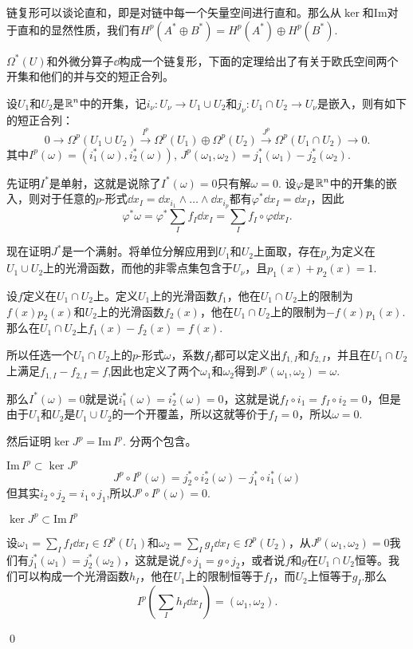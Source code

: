 \para \label{directsum} 链复形可以谈论直和，即是对链中每一个矢量空间进行直和。那么从$\ker$和$\mathrm{Im}$对于直和的显然性质，我们有$H^p(A^*\oplus B^*)=H^p(A^*)\oplus H^p(B^*)$.

$\Omega^*(U)$和外微分算子$\dd$构成一个链复形，下面的定理给出了有关于欧氏空间两个开集和他们的并与交的短正合列。

\theo 设$U_1$和$U_2$是$\mathbb{R}^n$中的开集，记$i_\nu:U_\nu \to U_1 \cup U_2$和$j_\nu:U_1\cap U_2 \to U_\nu$是嵌入，则有如下的短正合列：
\[
0\to \Omega^p(U_1\cup U_2)\xrightarrow{I^p}\Omega^p(U_1)\oplus\Omega^p(U_2)\xrightarrow{J^p}\Omega^p(U_1\cap U_2)\to 0.
\]
其中$I^p(\omega)=(i_1^*(\omega),i_2^*(\omega))$, $J^p(\omega_1,\omega_2)=j_1^*(\omega_1)-j_2^*(\omega_2)$.

\proof 先证明$I^*$是单射，这就是说除了$I^*(\omega)=0$只有解$\omega=0$. 设$\varphi$是$\mathbb{R}^n$中的开集的嵌入，则对于任意的$p$-形式$\dd x_I=\dd x_{i_1}\wedge\dots\wedge\dd x_{i_p}$都有$\varphi^* \dd x_I =\dd x_I$，因此
\[
\varphi^*\omega=\varphi^*\sum_If_I\dd x_I=\sum_If_I\circ\varphi \dd x_I.
\]

现在证明$J^*$是一个满射。将单位分解应用到$U_1$和$U_2$上面取，存在$p_\nu$为定义在$U_1\cup U_2$上的光滑函数，而他的非零点集包含于$U_\nu$，且$p_1(x)+p_2(x)=1$.

设$f$定义在$U_1\cap U_2$上。定义$U_1$上的光滑函数$f_1$，他在$U_1\cap U_2$上的限制为$f(x)p_2(x)$和$U_2$上的光滑函数$f_2(x)$，他在$U_1\cap U_2$上的限制为$-f(x)p_1(x)$.那么在$U_1\cap U_2$上$f_1(x)-f_2(x)=f(x)$.

所以任选一个$U_1\cap U_2$上的$p$-形式$\omega$，系数$f_I$都可以定义出$f_{1,I}$和$f_{2,I}$，并且在$U_1\cap U_2$上满足$f_{1,I}-f_{2,I}=f$,因此也定义了两个$\omega_1$和$\omega_2$得到$J^p(\omega_1,\omega_2)=\omega$.

那么$I^*(\omega)=0$就是说$i_1^*(\omega)=i_2^*(\omega)=0$，这就是说$f_I\circ i_1=f_I\circ i_2=0$，但是由于$U_1$和$U_2$是$U_1\cup U_2$的一个开覆盖，所以这就等价于$f_I=0$，所以$\omega=0$.

然后证明$\ker J^p=\mathrm{Im}\, I^p$. 分两个包含。

\begin{compactenum}[(1)]
\item $\mathrm{Im}\, I^p\subset \ker J^p$
\[
J^p\circ I^p(\omega)=j_2^*\circ i_2^*(\omega)-j_1^*\circ i_1^*(\omega)
\]
但其实$i_2\circ j_2=i_1\circ j_1$,所以$J^p\circ I^p(\omega)=0$.

\item $\ker J^p\subset \mathrm{Im}\, I^p$

设$\omega_1=\sum_I f_I \dd x_I\in \Omega^p(U_1)$和$\omega_2=\sum_I g_I \dd x_I\in \Omega^p(U_2)$，从$J^p(\omega_1,\omega_2)=0$我们有$j_1^*(\omega_1)=j_2^*(\omega_2)$，这就是说$f\circ j_1=g\circ j_2$，或者说$f$和$g$在$U_1\cap U_2$恒等。我们可以构成一个光滑函数$h_I$，他在$U_1$上的限制恒等于$f_I$，而$U_2$上恒等于$g_I$.那么
\[
I^p\left(\sum_Ih_I\dd x_I\right)=(\omega_1,\omega_2).
\]
\end{compactenum}
\qed

